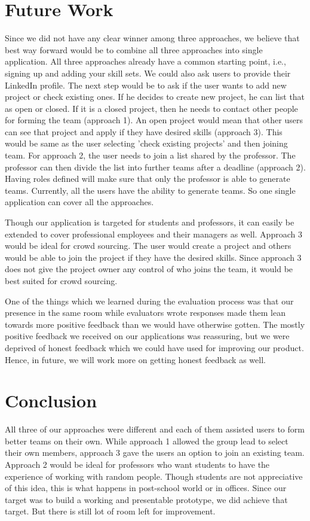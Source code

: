 \documentclass[conference]{IEEEtran}
\begin{document}
\section{Future Work}
Since we did not have any clear winner among three approaches, we believe that best way forward would be to combine all three approaches into single application. All three approaches already have a common starting point, i.e., signing up and adding your skill sets. We could also ask users to provide their LinkedIn profile. The next step would be to ask if the user wants to add new project or check existing ones. If he decides to create new project, he can list that as open or closed. If it is a closed project, then he needs to contact other people for forming the team (approach 1). An open project would mean that other users can see that project and apply if they have desired skills (approach 3). This would be same as the user selecting 'check existing projects' and then joining team. For approach 2, the user needs to join a list shared by the professor. The professor can then divide the list into further teams after a deadline (approach 2). Having roles defined will make sure that only the professor is able to generate teams. Currently, all the users have the ability to generate teams. So one single application can cover all the approaches.  

Though our application is targeted for students and professors, it can easily be extended to cover professional employees and their managers as well. Approach 3 would be ideal for crowd sourcing. The user would create a project and others would be able to join the project if they have the desired skills. Since approach 3 does not give the project owner any control of who joins the team, it would be best suited for crowd sourcing. 

One of the things which we learned during the evaluation process was that our presence in the same room while evaluators wrote responses made them lean towards more positive feedback than we would have otherwise gotten. The mostly positive feedback we received on our applications was reassuring, but we were deprived of honest feedback which we could have used for improving our product. Hence, in future, we will work more on getting honest feedback as well.  

\section{Conclusion}
All three of our approaches were different and each of them assisted users to form better teams on their own. While approach 1 allowed the group lead to select their own members, approach 3 gave the users an option to join an existing team. Approach 2 would be ideal for professors who want students to have the experience of working with random people. Though students are not appreciative of this idea, this is what happens in post-school world or in offices. Since our target was to build a working and presentable prototype, we did achieve that target. But there is still lot of room left for improvement. 
\end{document}
